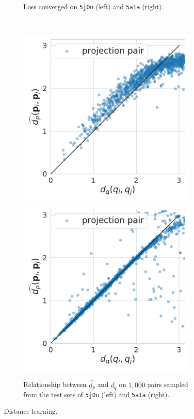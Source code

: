 \begin{figure}
\begin{minipage}[b]{0.45\linewidth}
\begin{subfigure}[b]{\linewidth}
            \caption{Loss converged on \texttt{5j0n} (left) and \texttt{5a1a} (right).\vspace{0.8em}}\label{fig:distance-learning:loss}
        \end{subfigure}
        \\ %
        \begin{subfigure}[b]{\linewidth}
            \centering
            \includegraphics[width=0.40\linewidth]{figures/dPdQ_5j0n_fullcvg_uniformS2_noise0.pdf}
            \hspace{0.5cm}
            \includegraphics[width=0.40\linewidth]{figures/dPdQ_5a1a_quartercvg_uniformS2_noise0_halfInplane.pdf}
            \caption{Relationship between $\widehat{d_p}$ and $d_q$ on $1,000$ pairs sampled from the test sets of \texttt{5j0n} (left) and \texttt{5a1a} (right).}\label{fig:distance-learning:dpdq}
        \end{subfigure}
        \caption{Distance learning.
        }
    \end{minipage}
\end{figure}


